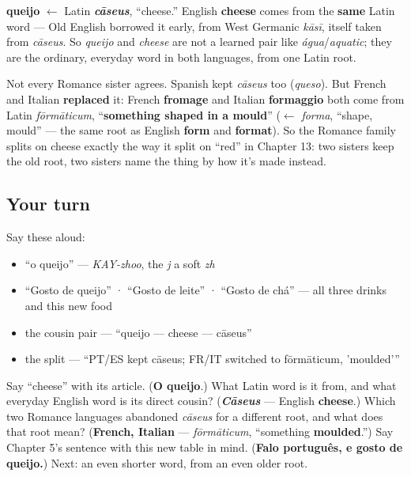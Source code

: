 \begin{cousinweb}
\textbf{queijo} $\leftarrow$ Latin \emph{\textbf{cāseus}}, \textquotedblleft{}cheese.\textquotedblright{} English \textbf{cheese} comes from the \textbf{same} Latin word — Old English borrowed it early, from West Germanic \emph{kāsī}, itself taken from \emph{cāseus}. So \emph{queijo} and \emph{cheese} are not a learned pair like \emph{água}/\emph{aquatic}; they are the ordinary, everyday word in both languages, from one Latin root.

Not every Romance sister agrees. Spanish kept \emph{cāseus} too (\emph{queso}). But French and Italian \textbf{replaced} it: French \textbf{fromage} and Italian \textbf{formaggio} both come from Latin \emph{fōrmāticum}, \textquotedblleft{}\textbf{something shaped in a mould}\textquotedblright{} ($\leftarrow$ \emph{forma}, \textquotedblleft{}shape, mould\textquotedblright{} — the same root as English \textbf{form} and \textbf{format}). So the Romance family splits on cheese exactly the way it split on \textquotedblleft{}red\textquotedblright{} in Chapter 13: two sisters keep the old root, two sisters name the thing by how it's made instead.
\end{cousinweb}

\subsection*{Your turn}
Say these aloud:

\begin{itemize}
\raggedright
  \item \textquotedblleft{}o queijo\textquotedblright{} — \emph{KAY-zhoo}, the \emph{j} a soft \emph{zh}
  \item \textquotedblleft{}Gosto de queijo\textquotedblright{} · \textquotedblleft{}Gosto de leite\textquotedblright{} · \textquotedblleft{}Gosto de chá\textquotedblright{} — all three drinks and this new food
  \item the cousin pair — \textquotedblleft{}queijo — cheese — cāseus\textquotedblright{}
  \item the split — \textquotedblleft{}PT/ES kept cāseus; FR/IT switched to fōrmāticum, 'moulded'\textquotedblright{}
\end{itemize}

\begin{tcolorbox}[breakable,colback=teal!4,colframe=teal!35!black,title={Before you move on}]
Say \textquotedblleft{}cheese\textquotedblright{} with its article. (\textbf{O queijo}.) What Latin word is it from, and what everyday English word is its direct cousin? (\emph{\textbf{Cāseus}} — English \textbf{cheese}.) Which two Romance languages abandoned \emph{cāseus} for a different root, and what does that root mean? (\textbf{French, Italian} — \emph{fōrmāticum}, \textquotedblleft{}something \textbf{moulded}.\textquotedblright{}) Say Chapter 5's sentence with this new table in mind. (\textbf{Falo português, e gosto de queijo.}) Next: an even shorter word, from an even older root.
\end{tcolorbox}
